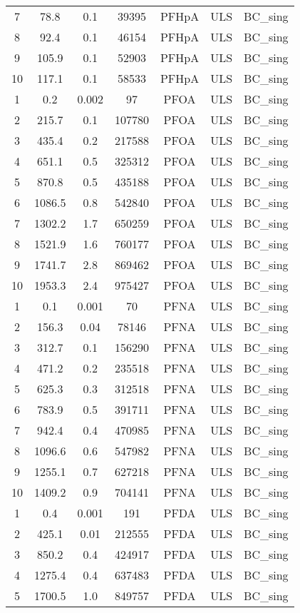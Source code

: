 \begin{longtable}[c]{ccccccc}
7 & 78.8 & 0.1 & 39395 & PFHpA & ULS & BC\_sing \\
8 & 92.4 & 0.1 & 46154 & PFHpA & ULS & BC\_sing \\
9 & 105.9 & 0.1 & 52903 & PFHpA & ULS & BC\_sing \\
10 & 117.1 & 0.1 & 58533 & PFHpA & ULS & BC\_sing \\
1 & 0.2 & 0.002 & 97 & PFOA & ULS & BC\_sing \\
2 & 215.7 & 0.1 & 107780 & PFOA & ULS & BC\_sing \\
3 & 435.4 & 0.2 & 217588 & PFOA & ULS & BC\_sing \\
4 & 651.1 & 0.5 & 325312 & PFOA & ULS & BC\_sing \\
5 & 870.8 & 0.5 & 435188 & PFOA & ULS & BC\_sing \\
6 & 1086.5 & 0.8 & 542840 & PFOA & ULS & BC\_sing \\
7 & 1302.2 & 1.7 & 650259 & PFOA & ULS & BC\_sing \\
8 & 1521.9 & 1.6 & 760177 & PFOA & ULS & BC\_sing \\
9 & 1741.7 & 2.8 & 869462 & PFOA & ULS & BC\_sing \\
10 & 1953.3 & 2.4 & 975427 & PFOA & ULS & BC\_sing \\
1 & 0.1 & 0.001 & 70 & PFNA & ULS & BC\_sing \\
2 & 156.3 & 0.04 & 78146 & PFNA & ULS & BC\_sing \\
3 & 312.7 & 0.1 & 156290 & PFNA & ULS & BC\_sing \\
4 & 471.2 & 0.2 & 235518 & PFNA & ULS & BC\_sing \\
5 & 625.3 & 0.3 & 312518 & PFNA & ULS & BC\_sing \\
6 & 783.9 & 0.5 & 391711 & PFNA & ULS & BC\_sing \\
7 & 942.4 & 0.4 & 470985 & PFNA & ULS & BC\_sing \\
8 & 1096.6 & 0.6 & 547982 & PFNA & ULS & BC\_sing \\
9 & 1255.1 & 0.7 & 627218 & PFNA & ULS & BC\_sing \\
10 & 1409.2 & 0.9 & 704141 & PFNA & ULS & BC\_sing \\
1 & 0.4 & 0.001 & 191 & PFDA & ULS & BC\_sing \\
2 & 425.1 & 0.01 & 212555 & PFDA & ULS & BC\_sing \\
3 & 850.2 & 0.4 & 424917 & PFDA & ULS & BC\_sing \\
4 & 1275.4 & 0.4 & 637483 & PFDA & ULS & BC\_sing \\
5 & 1700.5 & 1.0 & 849757 & PFDA & ULS & BC\_sing \\

\end{longtable}
